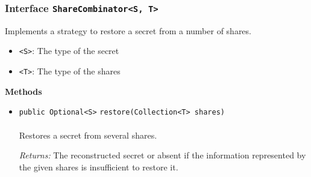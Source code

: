 \subsubsection{Interface \lstinline|ShareCombinator<S, T>|}
Implements a strategy to restore a secret from a number of shares. \\
\noindent\begin{minipage}[t]{5cm}
\vspace{0.3em}
\hspace*{2em}
\vspace{0.3em}
\end{minipage}

\begin{itemize}
\item \lstinline|<S>|: The type of the secret
\item \lstinline|<T>|: The type of the shares
\end{itemize}




\textbf{\sffamily Methods}
\begin{itemize}
\item \lstinline|public Optional<S>| \lstinline|restore|\lstinline|(Collection<T> shares)|\\ \\[-0.6em]
Restores a secret from several shares.

\emph{Returns:} The reconstructed secret or absent if the information represented
 by the given shares is insufficient to restore it.

\end{itemize}


